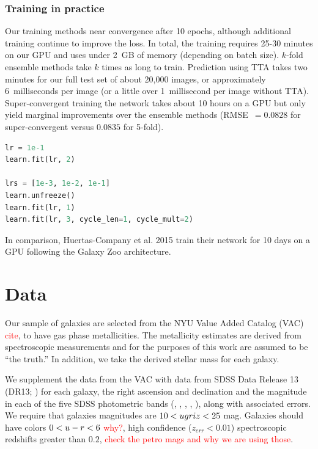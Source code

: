 \documentclass[fleqn,usenatbib]{mnras}
\newcommand{\editorial}[1]{\textcolor{red}{#1}}
\begin{document}
\subsubsection{Training in practice}

Our training methods near convergence after 10 epochs, although additional training continue to improve the loss.
In total, the training requires 25-30 minutes on our GPU and uses under 2~GB of memory (depending on batch size).
$k$-fold ensemble methods take $k$ times as long to train.
Prediction using TTA takes two minutes for our full test set of about 20,000 images, or approximately 6~milliseconds per image (or a little over 1~millisecond per image without TTA).
Super-convergent training the network takes about 10 hours on a GPU but only yield marginal improvements over the ensemble methods (RMSE~$= 0.0828$ for super-convergent versus $0.0835$ for 5-fold).

\begin{lstlisting}[language=PYTHON]
lr = 1e-1
learn.fit(lr, 2)

lrs = [1e-3, 1e-2, 1e-1]
learn.unfreeze()
learn.fit(lr, 1)
learn.fit(lr, 3, cycle_len=1, cycle_mult=2)
\end{lstlisting}

In comparison, Huertas-Company et al. 2015 train their network for 10 days on a GPU following the Galaxy Zoo architecture.

\section{Data}\label{sec:data}
Our sample of galaxies are selected from the NYU Value Added Catalog (VAC) \editorial{cite}, to have gas phase metallicities. The metallicity estimates \citep{Tremonti2004} are derived from spectroscopic measurements and for the purposes of this work are assumed to be ``the truth.'' In addition, we take the derived stellar mass for each galaxy.

We supplement the data from the VAC with data from SDSS Data Release 13 (DR13; \citealt{Albareti2017}) for each galaxy, the right ascension and declination and the magnitude in each of the five SDSS photometric bands (\sdssu, \sdssg, \sdssr, \sdssi, \sdssz), along with associated errors. We require that galaxies magnitudes are $10 < \hbox{$u$}\hbox{$g$}\hbox{$r$}\hbox{$i$}\hbox{$z$} < 25$ mag. Galaxies should have colors $0 < \hbox{$u$}-\hbox{$r$} < 6$ \editorial{why?}, high confidence ($z_{err} < 0.01$) spectroscopic redshifts greater than $0.2$, \editorial{check the petro mags and why we are using those}.
\end{document}
